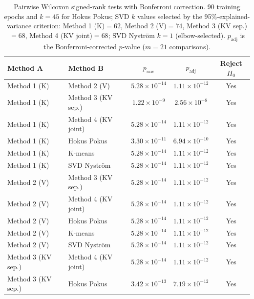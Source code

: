 \begin{table}[H]
\centering
\caption{Pairwise Wilcoxon signed-rank tests with Bonferroni correction.
90 training epochs and $k=45$ for Hokus Pokus; SVD $k$ values selected by the
95\%-explained-variance criterion: Method 1 (K)$=62$, Method 2 (V)$=74$,
Method 3 (KV sep.)$=68$, Method 4 (KV joint)$=68$; SVD Nyström $k=1$
(elbow-selected). $p_\text{adj}$ is the Bonferroni-corrected $p$-value
($m=21$ comparisons).}
\label{tab:stat_tests_best_k}
\begin{tabular}{ll cc c}
\toprule
Method A & Method B & $p_\text{raw}$ & $p_\text{adj}$ & Reject $H_0$ \\
\midrule
Method 1 (K)       & Method 2 (V)         & $5.28 \times 10^{-14}$ & $1.11 \times 10^{-12}$ & Yes \\
Method 1 (K)       & Method 3 (KV sep.)   & $1.22 \times 10^{-9}$  & $2.56 \times 10^{-8}$  & Yes \\
Method 1 (K)       & Method 4 (KV joint)  & $5.28 \times 10^{-14}$ & $1.11 \times 10^{-12}$ & Yes \\
Method 1 (K)       & Hokus Pokus          & $3.30 \times 10^{-11}$ & $6.94 \times 10^{-10}$ & Yes \\
Method 1 (K)       & K-means              & $5.28 \times 10^{-14}$ & $1.11 \times 10^{-12}$ & Yes \\
Method 1 (K)       & SVD Nyström          & $5.28 \times 10^{-14}$ & $1.11 \times 10^{-12}$ & Yes \\
\addlinespace
Method 2 (V)       & Method 3 (KV sep.)   & $5.28 \times 10^{-14}$ & $1.11 \times 10^{-12}$ & Yes \\
Method 2 (V)       & Method 4 (KV joint)  & $5.28 \times 10^{-14}$ & $1.11 \times 10^{-12}$ & Yes \\
Method 2 (V)       & Hokus Pokus          & $5.28 \times 10^{-14}$ & $1.11 \times 10^{-12}$ & Yes \\
Method 2 (V)       & K-means              & $5.28 \times 10^{-14}$ & $1.11 \times 10^{-12}$ & Yes \\
Method 2 (V)       & SVD Nyström          & $5.28 \times 10^{-14}$ & $1.11 \times 10^{-12}$ & Yes \\
\addlinespace
Method 3 (KV sep.) & Method 4 (KV joint)  & $5.28 \times 10^{-14}$ & $1.11 \times 10^{-12}$ & Yes \\
Method 3 (KV sep.) & Hokus Pokus          & $3.42 \times 10^{-13}$ & $7.19 \times 10^{-12}$ & Yes \\

\end{tabular}
\end{table}
